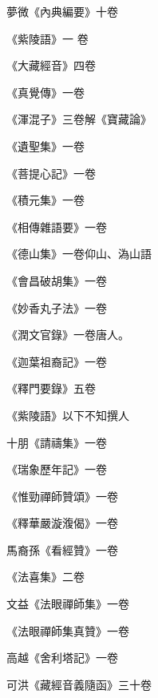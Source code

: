 \begin{pinyinscope}
 夢微《內典編要》十卷



 《紫陵語》一
 卷



 《大藏經音》四卷



 《真覺傳》一卷



 《渾混子》三卷解《寶藏論》



 《遺聖集》一卷



 《菩提心記》一卷



 《積元集》一卷



 《相傳雜語要》一卷



 《德山集》一卷仰山、溈山語



 《會昌破胡集》一卷



 《妙香丸子法》一卷



 《潤文官錄》一卷唐人。



 《迦葉祖裔記》一卷



 《釋門要錄》五卷



 《紫陵語》以下不知撰人



 十朋《請禱集》一卷



 《瑞象歷年記》一卷



 《惟勁禪師贊頌》一卷



 《釋華嚴漩澓偈》一卷



 馬裔孫《看經贊》一卷



 《法喜集》二卷



 文益《法眼禪師集》一卷



 《法眼禪師集真贊》一卷



 高越《舍利塔記》一卷



 可洪《藏經音義隨函》三十卷




\end{pinyinscope}
